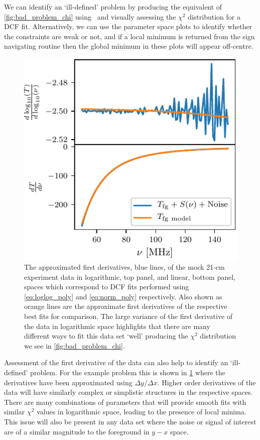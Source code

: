 We can identify an `ill-defined' problem by producing the equivalent of \cref{fig:bad_problem_chi} using \maxsmooth~and visually assessing the $\chi^2$ distribution for a DCF fit. Alternatively, we can use the parameter space plots to identify whether the constraints are weak or not, and if a local minimum is returned from the sign navigating routine then the global minimum in these plots will appear off-centre.

\begin{figure}
    \centering
    \includegraphics{maxsmooth/figs/Figure6.pdf}
    \caption{The approximated first derivatives, blue lines, of the mock 21-cm experiment data in logarithmic, top panel, and linear, bottom panel, spaces which correspond to DCF fits performed using \cref{eq:loglog_poly} and \cref{eq:norm_poly} respectively. Also shown as orange lines are the approximate first derivatives of the respective best fits for comparison. The large variance of the first derivative of the data in logarithmic space highlights that there are many different ways to fit this data set `well' producing the $\chi^2$ distribution we see in \cref{fig:bad_problem_chi}.}
    \label{fig:bad_prob_derivatives}
\end{figure}

Assessment of the first derivative of the data can also help to identify an `ill-defined' problem. For the example problem this is shown in \cref{fig:bad_prob_derivatives} where the derivatives have been approximated using $\Delta y/ \Delta x$. Higher order derivatives of the data will have similarly complex or simplistic structures in the respective spaces. There are many combinations of parameters that will provide smooth fits with similar $\chi^2$ values in logarithmic space, leading to the presence of local minima. This issue will also be present in any data set where the noise or signal of interest are of a similar magnitude to the foreground in $y - x$ space.

